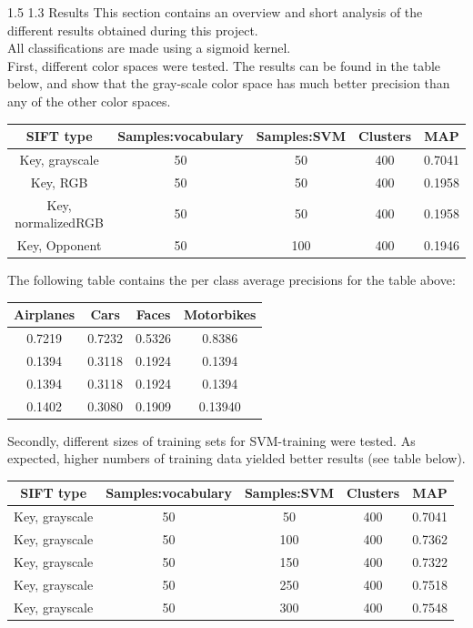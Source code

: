 \documentclass[12pt,a4paper]{amsart}
\makeatletter
\def\section{%
  \@startsection{section}{1}{\z@}%
  {1.5\linespacing\@plus\linespacing}%
  {1.3\linespacing}%
  {\bfseries\normalfont\scshape}
}
\makeatother
\begin{document}
\section{Results}
This section contains an overview and short analysis of the different results obtained during this project. \\
All classifications are made using a sigmoid kernel.\\
\iffalse
First, different color spaces were tested. The results can be found in the table below, and show that the gray-scale color space has much better precision than any of the other color spaces. \\
\begin{tabular}{|ccccc|}
\hline
SIFT type & Samples:vocabulary & Samples:SVM & Clusters & MAP\\
\toprule
Key, grayscale & 50 & 50 & 400 & 0.7041 \\
Key, RGB & 50 & 50 & 400 & 0.1958 \\
Key, normalizedRGB & 50 & 50 & 400 & 0.1958\\
Key, Opponent & 50 & 100 & 400 & 0.1946\\
\hline
\end{tabular}
The following table contains the per class average precisions for the table above:\\
\begin{tabular}{|cccc|}
Airplanes & Cars & Faces & Motorbikes\\
\toprule
0.7219&0.7232&0.5326&0.8386\\
0.1394 & 0.3118 & 0.1924 & 0.1394\\
0.1394 & 0.3118 & 0.1924 & 0.1394\\
0.1402 & 0.3080 & 0.1909 & 0.13940\\
\hline
\end{tabular}
\newline
Secondly, different sizes of training sets for SVM-training were tested. As expected, higher numbers of training data yielded better results (see table below).\\
\begin{tabular}{|ccccc|}
\hline
SIFT type & Samples:vocabulary & Samples:SVM & Clusters & MAP\\
\toprule
Key, grayscale & 50 & 50 & 400 & 0.7041 \\
Key, grayscale & 50 & 100 & 400 & 0.7362\\
Key, grayscale & 50 & 150 & 400 &  0.7322\\
Key, grayscale & 50 & 250 & 400 &0.7518\\
Key, grayscale & 50 & 300 & 400 & 0.7548\\
\hline
\end{tabular}
\end{document}
